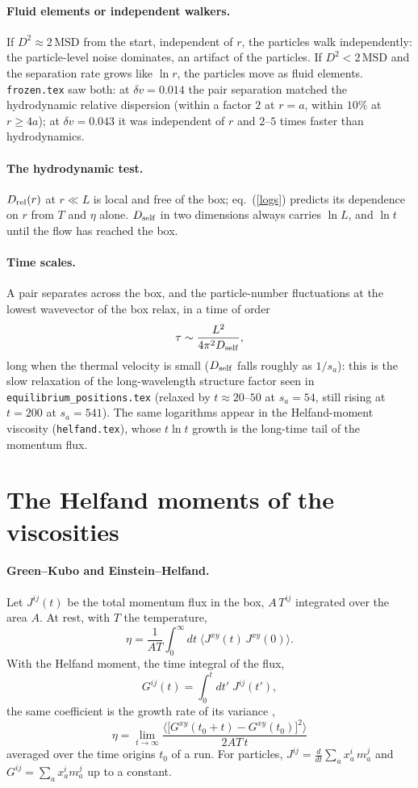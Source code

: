 \documentclass[11pt,aps,preprint,nofootinbib,superscriptaddress,tightenlines]{revtex4-2}
\def\st{\begin{equation}}
\def\stp{\end{equation}}
\def\Eq#1{eq.~(\ref{#1})}
\newcommand{\avg}[1]{\langle #1\rangle}
\let\oldparagraph\paragraph
\renewcommand{\paragraph}{\par\bigskip\oldparagraph}
\begin{document}
\paragraph{Fluid elements or independent walkers.}  If $D^2\approx2\,\mathrm{MSD}$ from the start, independent of $r$, the particles walk
independently: the particle-level noise dominates, an artifact of the particles.  If $D^2<2\,\mathrm{MSD}$ and the separation rate grows
like $\ln r$, the particles move as fluid elements.  \texttt{frozen.tex} saw both: at $\delta v=0.014$ the pair separation matched the
hydrodynamic relative dispersion (within a factor $2$ at $r=a$, within $10\%$ at $r\ge4a$); at $\delta v=0.043$ it was independent of $r$ and $2$--$5$
times faster than hydrodynamics.

\paragraph{The hydrodynamic test.}  $D_{\rm rel}(r)$ at $r\ll L$ is local and free of the box; \Eq{logs} predicts its dependence on $r$ from
$T$ and $\eta$ alone.  $D_{\rm self}$ in two dimensions always carries $\ln L$, and $\ln t$ until the flow has reached the box.

\paragraph{Time scales.}  A pair separates across the box, and the particle-number fluctuations at the lowest wavevector of the box
relax, in a time of order
\st
\tau\sim\frac{L^2}{4\pi^2D_{\rm self}} ,
\stp
long when the thermal velocity is small ($D_{\rm self}$ falls roughly as $1/s_a$): this is the slow relaxation of the long-wavelength structure
factor seen in \texttt{equilibrium\_positions.tex} (relaxed by $t\approx20$--$50$ at $s_a=54$, still rising at $t=200$ at $s_a=541$).  The same
logarithms appear in the Helfand-moment viscosity (\texttt{helfand.tex}), whose $t\ln t$ growth is the long-time tail of the momentum flux.


\section{The Helfand moments of the viscosities}
\label{sec:moments}

\paragraph{Green--Kubo and Einstein--Helfand.}  Let $J^{ij}(t)$ be the total momentum flux in the box, $A\,T^{ij}$ integrated over the
area $A$.  At rest, with $T$ the temperature,
\st
\eta=\frac1{AT}\int_0^\infty dt\;\avg{J^{xy}(t)\,J^{xy}(0)} .
\stp
With the Helfand moment, the time integral of the flux,
\st
G^{ij}(t)=\int_0^tdt'\;J^{ij}(t') ,
\stp
the same coefficient is the growth rate of its variance \cite{Helfand},
\st
\boxed{\;\eta=\lim_{t\to\infty}\frac{\avg{\big[G^{xy}(t_0+t)-G^{xy}(t_0)\big]^2}}{2AT\,t}\;}
\label{helfand}
\stp
averaged over the time origins $t_0$ of a run.  For particles, $J^{ij}=\frac{d}{dt}\sum_ax_a^i\,m_a^j$ and $G^{ij}=\sum_ax_a^im_a^j$ up to a constant.
\end{document}
